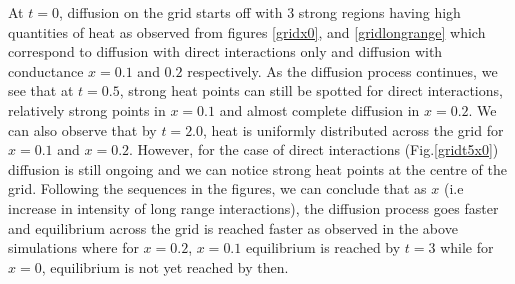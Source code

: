 \documentclass[10pt,a4paper]{article}
\begin{document}
\begin{enumerate}[i)]
\begin{enumerate}[a)]
    		At $t=0$, diffusion on the grid starts off with $3$ strong regions having high quantities of heat as observed from figures \ref{gridx0}, and \ref{gridlongrange} which correspond to diffusion with direct interactions only and diffusion with conductance $x = 0.1$ and $0.2$ respectively. As the diffusion process continues, we see that at $t=0.5$, strong heat points can still be spotted for direct interactions, relatively strong points in $x=0.1$ and almost complete diffusion in $x=0.2$. We can also observe that by $t=2.0$, heat is uniformly distributed across the grid for $x=0.1$ and $x=0.2$. However, for the case of direct interactions (Fig.\ref{gridt5x0}) diffusion is still ongoing and we can notice strong heat points at the centre of the grid. Following the sequences in the figures, we can conclude that as $x$ (i.e increase in intensity of long range interactions), the diffusion process goes faster and equilibrium across the grid is reached faster as observed in the above simulations where for $x=0.2$, $x=0.1$ equilibrium is reached by $t=3$ while for $x=0$, equilibrium is not yet reached by then.
    		

\end{enumerate}
\end{enumerate}
\end{document}
